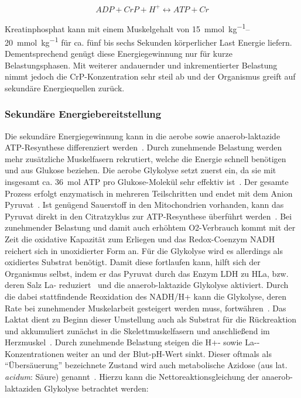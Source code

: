 \begin{equation}
ADP + CrP + H^+ \leftrightarrow ATP + Cr
\label{eq:formel3}
\end{equation}

Kreatinphosphat kann mit einem Muskelgehalt von \SIrange{15}{20}{\milli\mole\per\kg} für ca. fünf bis sechs Sekunden körperlicher Last Energie liefern. Dementsprechend genügt diese Energiegewinnung nur für kurze Belastungsphasen. Mit weiterer andauernder und inkrementierter Belastung nimmt jedoch die CrP-Konzentration sehr steil ab und der Organismus greift auf sekundäre Energiequellen zurück.

\subsubsection{Sekundäre Energiebereitstellung}

Die sekundäre Energiegewinnung kann in die aerobe sowie anaerob-laktazide ATP-Resynthese differenziert werden~\cite{Kroidl.2015}. Durch zunehmende Belastung werden mehr zusätzliche Muskelfasern rekrutiert, welche die Energie schnell benötigen und aus Glukose beziehen. Die aerobe Glykolyse setzt zuerst ein, da sie mit insgesamt ca. \SI{36}{\mole} ATP pro Glukose-Molekül sehr effektiv ist~\cite{Kroidl.2015}. Der gesamte Prozess erfolgt enzymatisch in mehreren Teilschritten und endet mit dem Anion Pyruvat~\cite{Heck.2006}. Ist genügend Sauerstoff in den Mitochondrien vorhanden, kann das Pyruvat direkt in den Citratzyklus zur ATP-Resynthese überführt werden~\cite{Rassow.2008}. Bei zunehmender Belastung und damit auch erhöhtem \acs{O2}-Verbrauch kommt mit der Zeit die oxidative Kapazität zum Erliegen und das Redox-Coenzym \acs{NADH} reichert sich in unoxidierter Form an. Für die Glykolyse wird es allerdings als oxidiertes Substrat benötigt. Damit diese fortlaufen kann, hilft sich der Organismus selbst, indem er das Pyruvat durch das Enzym \ac{LDH} zu \ac{HLa}, bzw. deren Salz \ac{La-} reduziert~\cite{Rassow.2008} und die anaerob-laktazide Glykolyse aktiviert. Durch die dabei stattfindende Reoxidation des \acs{NADH}/\acs{H+} kann die Glykolyse, deren Rate bei zunehmender Muskelarbeit gesteigert werden muss, fortwähren~\cite{Heck.2006}. Das Laktat dient zu Beginn dieser Umstellung auch als Substrat für die Rückreaktion und akkumuliert zunächst in die Skelettmuskelfasern und anschließend im Herzmuskel~\cite{Klinke.2003}. Durch zunehmende Belastung steigen die \acs{H+}- sowie \acs{La-}-Konzentrationen weiter an und der Blut-pH-Wert sinkt. Dieser oftmals als "`Übersäuerung"' bezeichnete Zustand wird auch metabolische Azidose (aus lat. \textsl{acidum}: Säure) genannt~\cite{Boening.2008}. Hierzu kann die Nettoreaktionsgleichung der anaerob-laktaziden Glykolyse betrachtet werden:

